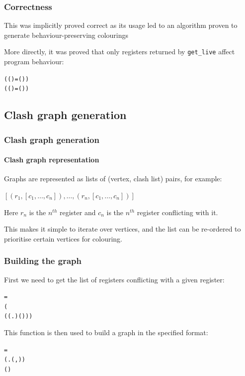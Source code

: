 \documentclass{beamer}
\begin{document}
\begin{frame}[containsverbatim]
\frametitle{Correctness}
This was implicitly proved correct as its usage led to an algorithm proven to generate behaviour-preserving colourings

More directly, it was proved that only registers returned by \texttt{get\_live} affect program behaviour:

\begin{alltt}\small
	\HOLTokenTurnstile{} (  (  ) =   (  )) \HOLTokenImp{}
   ( (   )  =  (   ) )
\end{alltt}
\end{frame}

\subsection{Clash graph generation}
\begin{frame}
\frametitle{Clash graph generation}
\framesubtitle{Clash graph representation}
Graphs are represented as lists of (vertex, clash list) pairs, for example:

$[ (r_1, [c_1, \ldots, c_n]), \ldots, (r_n, [c_1, \ldots, c_n]) ]$

Here $r_n$ is the $n^{th}$ register and $c_n$ is the $n^{th}$ register conflicting with it.

This makes it simple to iterate over vertices, and the list can be re-ordered to prioritise certain vertices for colouring.
\end{frame}

\begin{frame}[containsverbatim]
\frametitle{Building the graph}
First we need to get the list of registers conflicting with a given register:

\begin{alltt}\small
	    =
 
  (
     ( (\HOLTokenLambda{}.   ) (  )))
\end{alltt}

This function is then used to build a graph in the specified format:

\begin{alltt}\small
	   =
 (\HOLTokenLambda{}. (,   ))
  (  )
\end{alltt}
\end{frame}
\end{document}
